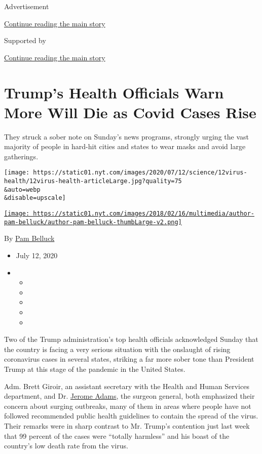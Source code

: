 Advertisement

\protect\hyperlink{after-top}{Continue reading the main story}

Supported by

\protect\hyperlink{after-sponsor}{Continue reading the main story}

\hypertarget{trumps-health-officials-warn-more-will-die-as-covid-cases-rise}{%
\section{Trump's Health Officials Warn More Will Die as Covid Cases
Rise}\label{trumps-health-officials-warn-more-will-die-as-covid-cases-rise}}

They struck a sober note on Sunday's news programs, strongly urging the
vast majority of people in hard-hit cities and states to wear masks and
avoid large gatherings.

\texttt{[image: https://static01.nyt.com/images/2020/07/12/science/12virus-health/12virus-health-articleLarge.jpg?quality=75\\\&auto=webp\\\&disable=upscale]}

\href{https://www.nytimes.com/by/pam-belluck}{\texttt{[image: https://static01.nyt.com/images/2018/02/16/multimedia/author-pam-belluck/author-pam-belluck-thumbLarge-v2.png]}}

By \href{https://www.nytimes.com/by/pam-belluck}{Pam Belluck}

\begin{itemize}
\item
  July 12, 2020
\item
  \begin{itemize}
  \item
  \item
  \item
  \item
  \item
  \end{itemize}
\end{itemize}

Two of the Trump administration's top health officials acknowledged
Sunday that the country is facing a very serious situation with the
onslaught of rising coronavirus cases in several states, striking a far
more sober tone than President Trump at this stage of the pandemic in
the United States.

Adm. Brett Giroir, an assistant secretary with the Health and Human
Services department, and Dr.
\href{https://www.nytimes.com/2020/07/21/us/politics/jerome-adams-surgeon-general-trump-coronavirus.html}{Jerome
Adams}, the surgeon general, both emphasized their concern about surging
outbreaks, many of them in areas where people have not followed
recommended public health guidelines to contain the spread of the virus.
Their remarks were in sharp contrast to Mr. Trump's contention just last
week that 99 percent of the cases were ``totally harmless'' and his
boast of the country's low death rate from the virus.

